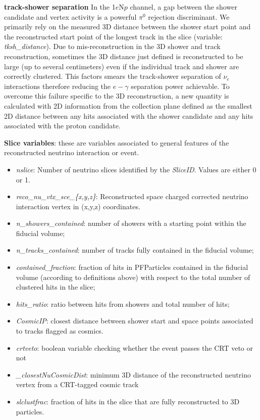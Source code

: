 \par \noindent \textbf{track-shower separation} In the 1$e$N$p$ channel, a gap between the shower candidate and vertex activity is a powerful $\pi^0$ rejection discriminant. We primarily rely on the measured 3D distance between the shower start point and the reconstructed start point of the longest track in the slice (variable: \emph{tksh\_distance}). Due to mis-reconstruction in the 3D shower and track reconstruction, sometimes the 3D distance just defined is reconstructed to be large (up to several centimeters) even if the individual track and shower are correctly clustered. This factors smears the track-shower separation of $\nu_e$ interactions therefore reducing the $e-\gamma$ separation power achievable. To overcome this failure specific to the 3D reconstruction, a new quantity is calculated with 2D information from the collection plane defined as the smallest 2D distance between any hits associated with the shower candidate and any hits associated with the proton candidate.


\par \noindent  \textbf{Slice variables}: these are variables associated to general features of the reconstructed neutrino interaction or event.

\begin{itemize}
    \item \emph{nslice}: Number of neutrino slices identified by the \emph{SliceID}. Values are either 0 or 1.
    \item \emph{reco\_nu\_vtx\_sce\_\{x,y,z\}}: Reconstructed space charged corrected neutrino interaction vertex in (x,y,z) coordinates.
    \item \emph{n\_showers\_contained}: number of showers with a starting point within the fiducial volume;
    \item \emph{n\_tracks\_contained}: number of tracks fully contained in the fiducial volume;
    \item \emph{contained\_fraction}: fraction of hits in PFParticles contained in the fiducial volume (according to definitions above) with respect to the total number of clustered hits in the slice;
    \item \emph{hits\_ratio}: ratio between hits from showers and total number of hits;
    \item \emph{CosmicIP}: closest distance between shower start and space points associated to tracks flagged as cosmics.
    \item \emph{crtveto}: boolean variable checking whether the event passes the CRT veto or not
    \item \emph{\_closestNuCosmicDist}: minimum 3D distance of the reconstructed neutrino vertex from a CRT-tagged cosmic track
    \item \emph{slclustfrac}: fraction of hits in the slice that are fully reconstructed to 3D particles.
\end{itemize}

